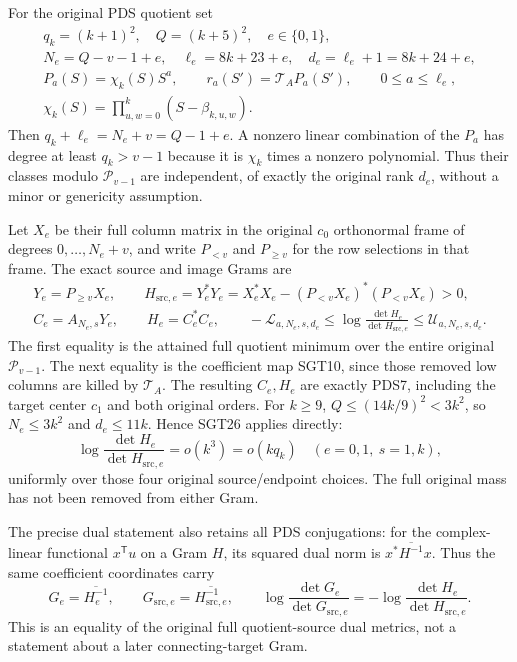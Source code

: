 \documentclass[11pt,a4paper]{article}
\begin{document}
For the original PDS quotient set
\[
\begin{gathered}
 q_k=(k+1)^2,\quad Q=(k+5)^2,\quad e\in\{0,1\},\\
 N_e=Q-v-1+e,\quad
 \ell_e=8k+23+e,\quad d_e=\ell_e+1=8k+24+e,\\
 P_a(S)=\chi_k(S)S^a,\qquad
 r_a(S')=\mathcal T_AP_a(S'),\qquad 0\le a\le\ell_e,\\
 \chi_k(S)=\prod_{u,w=0}^k(S-\beta_{k,u,w}) .
\end{gathered}\tag{SGT29}
\]
Then $q_k+\ell_e=N_e+v=Q-1+e$. A nonzero linear combination
of the $P_a$ has degree at least $q_k>v-1$ because it is
$\chi_k$ times a nonzero polynomial. Thus their classes modulo
$\mathcal P_{v-1}$ are independent, of exactly the original rank
$d_e$, without a minor or genericity assumption.

Let $X_e$ be their full column matrix in the original
$c_0$ orthonormal frame of degrees $0,\ldots,N_e+v$, and write
$P_{<v}$ and $P_{\ge v}$ for the row selections in that frame.
The exact source and image Grams are
\[
\begin{gathered}
 Y_e=P_{\ge v}X_e,\qquad
 H_{\mathrm{src},e}=Y_e^*Y_e
       =X_e^*X_e-(P_{<v}X_e)^*(P_{<v}X_e)>0,\\
 C_e=A_{N_e,s}Y_e,\qquad
 H_e=C_e^*C_e,\qquad
 -\mathcal L_{a,N_e,s,d_e}
       \le\log\frac{\det H_e}{\det H_{\mathrm{src},e}}
       \le\mathcal U_{a,N_e,s,d_e}.
\end{gathered}\tag{SGT30}
\]
The first equality is the attained full quotient minimum over the
entire original $\mathcal P_{v-1}$. The next equality is the
coefficient map SGT10, since those removed low columns are killed
by $\mathcal T_A$. The resulting $C_e,H_e$ are exactly PDS7,
including the target center $c_1$ and both original orders.
For $k\ge9$, $Q\le(14k/9)^2<3k^2$, so $N_e\le3k^2$ and
$d_e\le11k$. Hence SGT26 applies directly:
\[
 \log\frac{\det H_e}{\det H_{\mathrm{src},e}}
          =o(k^3)=o(kq_k)
 \quad(e=0,1,\ s=1,k),
 \tag{SGT31}
\]
uniformly over those four original source/endpoint choices.
The full original mass has not been removed from either Gram.

The precise dual statement also retains all PDS conjugations:
for the complex-linear functional $x^{\mathsf T}u$ on a Gram $H$,
its squared dual norm is $x^*\overline{H^{-1}}x$.
Thus the same coefficient coordinates carry
\[
 G_e=\overline{H_e^{-1}},\qquad
 G_{\mathrm{src},e}=\overline{H_{\mathrm{src},e}^{-1}},\qquad
 \log\frac{\det G_e}{\det G_{\mathrm{src},e}}
       =-\log\frac{\det H_e}{\det H_{\mathrm{src},e}} .
 \tag{SGT32}
\]
This is an equality of the original full quotient-source dual
metrics, not a statement about a later connecting-target Gram.
\end{document}
